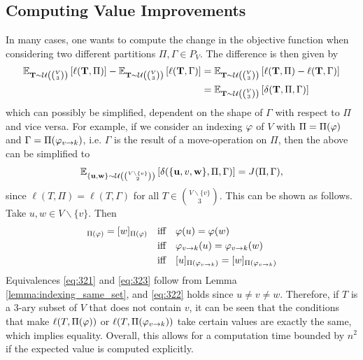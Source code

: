 \subsection{Computing Value Improvements}
In many cases, one wants to compute the change in the objective function when considering two different partitions $\Pi,\Gamma \in P_V$. The difference is then given by
\begin{align*}
    \mathbb{E}_{{\bf T} \sim \mathcal{U}\left(\binom{V}{3}\right)} \left[\ell({\bf T}, \Pi)\right] - \mathbb{E}_{{\bf T} \sim \mathcal{U}\left(\binom{V}{3}\right)} \left[\ell({\bf T}, \Gamma)\right] &= \mathbb{E}_{{\bf T} \sim \mathcal{U}\left(\binom{V}{3}\right)} \left[\ell({\bf T}, \Pi) - \ell({\bf T}, \Gamma)\right] \\
    &= \mathbb{E}_{{\bf T} \sim \mathcal{U}\left(\binom{V}{3}\right)} \left[\delta({\bf T}, \Pi, \Gamma)\right]
\end{align*}
which can possibly be simplified, dependent on the shape of $\Gamma$ with respect to $\Pi$ and vice versa. For example, if we consider an indexing $\varphi$ of $V$ with $\Pi = \Pi(\varphi)$ and $\Gamma = \Pi(\varphi_{v\rightarrow k})$, i.e. $\Gamma$ is the result of a move-operation on $\Pi$, then the above can be simplified to
\begin{align*}
    \mathbb{E}_{{\bf \{u,w\}} \sim \mathcal{U}\left(\binom{V\backslash\{v\}}{2}\right)} \left[\delta(\{{\bf u},v,{\bf w} \}, \Pi, \Gamma)\right] = J(\Pi, \Gamma),
\end{align*}
since $\ell(T,\Pi) = \ell(T,\Gamma)$ for all $T \in \binom{V \backslash \{ v\} }{3}$. This can be shown as follows. Take $u,w \in V\backslash\{v\}$. Then 
\begin{align}
    [u]_{\Pi(\idx)} = [w]_{\Pi(\idx)} &\iff \idx(u) = \idx(w)  \label{eq:321} \\
    &\iff \move{\idx}{v}{k}(u) = \move{\idx}{v}{k}(w)  \label{eq:322} \\
    &\iff [u]_{\Pi(\move{\idx}{v}{k})} = [w]_{\Pi(\move{\idx}{v}{k})}  \label{eq:323}
\end{align}
Equivalences \eqref{eq:321} and \eqref{eq:323} follow from Lemma \ref{lemma:indexing_same_set}, and \eqref{eq:322} holds since $u \neq v \neq w$. Therefore, if $T$ is a 3-ary subset of $V$ that does not contain $v$, it can be seen that the conditions that make $\ell(T,\Pi(\varphi))$ or $\ell(T,\Pi(\varphi_{v\rightarrow k}))$ take certain values are exactly the same, which implies equality. Overall, this allows for a computation time bounded by $n^2$ if the expected value is computed explicitly. 
